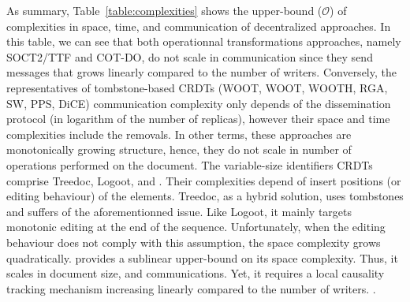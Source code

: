 \begin{asparadesc}
\item [As summary,] Table~\ref{table:complexities} shows the upper-bound
  ($\mathcal{O}$) of complexities in space, time, and communication of
  decentralized approaches. In this table, we can see that both operationnal
  transformations approaches, namely SOCT2/TTF and COT-DO, do not scale in
  communication since they send messages that grows linearly compared to the
  number of writers. Conversely, the representatives of tombstone-based CRDTs
  (WOOT, WOOT, WOOTH, RGA, SW, PPS, DiCE) communication complexity only depends
  of the dissemination protocol (in logarithm of the number of replicas),
  however their space and time complexities include the removals. In other
  terms, these approaches are monotonically growing structure, hence, they do
  not scale in number of operations performed on the document. The variable-size
  identifiers CRDTs comprise Treedoc, Logoot, and \LSEQ. Their complexities
  depend of insert positions (or editing behaviour) of the elements. Treedoc, as
  a hybrid solution, uses tombstones and suffers of the aforementionned
  issue. Like Logoot, it mainly targets monotonic editing at the end of the
  sequence. Unfortunately, when the editing behaviour does not comply with this
  assumption, the space complexity grows quadratically. \LSEQ provides a
  sublinear upper-bound on its space complexity. Thus, it scales in document
  size, and communications. Yet, it requires a local causality tracking
  mechanism increasing linearly compared to the number of
  writers. .
\end{asparadesc}

